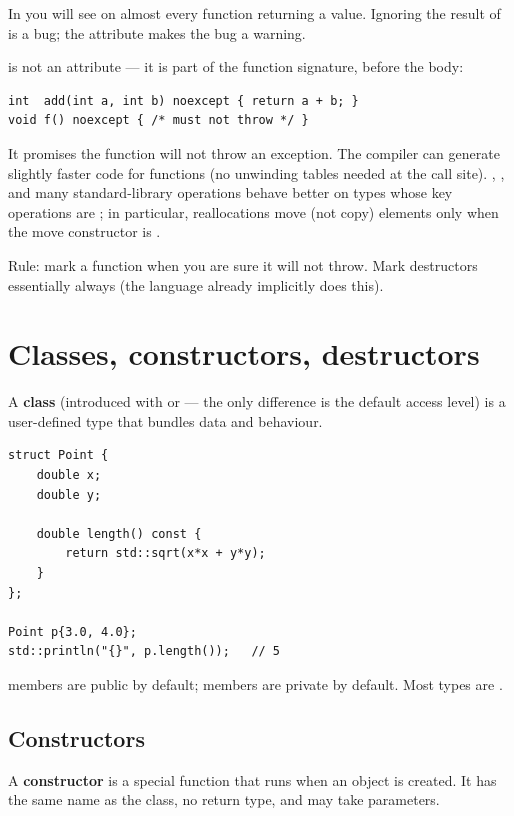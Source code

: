 In \maya{} you will see \code{[[nodiscard]]} on almost every
function returning a value. Ignoring the result of
 is a bug; the attribute makes the bug a warning.

 is not an attribute --- it is part of the function
signature, before the body:

\begin{lstlisting}
int  add(int a, int b) noexcept { return a + b; }
void f() noexcept { /* must not throw */ }
\end{lstlisting}

It promises the function will not throw an exception. The compiler
can generate slightly faster code for  functions
(no unwinding tables needed at the call site). ,
, and many standard-library operations behave better
on types whose key operations are ; in particular,
 reallocations move (not copy) elements only when
the move constructor is .

Rule: mark a function  when you are sure it will not
throw. Mark destructors  essentially always (the
language already implicitly does this).

\section{Classes, constructors, destructors}
\label{sec:cpp:classes}

A \textbf{class} (introduced with  or  ---
the only difference is the default access level) is a user-defined
type that bundles data and behaviour.

\begin{lstlisting}
struct Point {
    double x;
    double y;

    double length() const {
        return std::sqrt(x*x + y*y);
    }
};

Point p{3.0, 4.0};
std::println("{}", p.length());   // 5
\end{lstlisting}

 members are public by default;  members
are private by default. Most \maya{} types are .

\subsection{Constructors}

A \textbf{constructor} is a special function that runs when an object
is created. It has the same name as the class, no return type, and
may take parameters.

